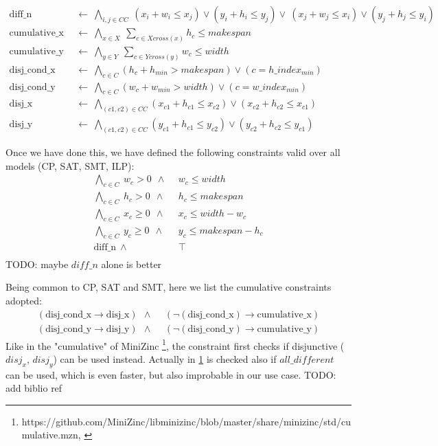     \begin{align}
      \text{diff\_n}\ &\ \leftarrow\ \bigwedge_{i,j \in CC}\ (x_i + w_i \leq x_j) \lor (y_i + h_i \leq y_j) \lor\ (x_j + w_j \leq x_i) \lor (y_j + h_j \leq y_i) \label{eq:diffn} \\
      \text{cumulative\_x}\ &\ \leftarrow\ \bigwedge_{x \in X}\ \sum_{c \in Xcross(x)} h_c \leq makespan \label{eq:cumulative_x} \\
      \text{cumulative\_y}\ &\ \leftarrow\ \bigwedge_{y \in Y}\ \sum_{c \in Ycross(y)} w_c \leq width \label{eq:cumulative_y} \\
      \text{disj\_cond\_x}\ &\ \leftarrow\ \bigwedge_{c \in C} (h_c + h_{min} > makespan) \lor (c = h\_index_{min}) \\
      \text{disj\_cond\_y}\ &\ \leftarrow\ \bigwedge_{c \in C} (w_c + w_{min} > width) \lor (c = w\_index_{min}) \\
      \text{disj\_x}\ &\ \leftarrow\ \bigwedge_{(c1,c2) \in CC} (x_{c1} + h_{c1} \leq x_{c2}) \lor (x_{c2} + h_{c2} \leq x_{c1}) \\
      \text{disj\_y}\ &\ \leftarrow\ \bigwedge_{(c1,c2) \in CC} (y_{c1} + h_{c1} \leq y_{c2}) \lor (y_{c2} + h_{c2} \leq y_{c1})
    \end{align}

    Once we have done this, we have defined the following constraints valid over all models (CP, SAT, SMT, ILP):
    \begin{align*}
        \bigwedge_{c \in C}\ w_c > 0\ \    \land\                   &\ w_c \leq width \\
        \bigwedge_{c \in C}\ h_c > 0\ \   \land\                    &\ h_c \leq makespan \\
        \bigwedge_{c \in C}\ x_c \geq 0\ \ \land\                   &\ x_c \leq width - w_c \\
        \bigwedge_{c \in C}\ y_c \geq 0\ \ \land\                   &\ y_c \leq makespan - h_c \\
        \text{diff\_n}\ \ \land\ &\ \top \\
    \end{align*}
    \colorbox{BurntOrange}{TODO: maybe $diff\_n$ alone is better}

    Being common to CP, SAT and SMT, here we list the cumulative constraints adopted:
    \begin{align*}
        (\text{disj\_cond\_x} \rightarrow \text{disj\_x})\ \ \land\ &\ (\neg (\text{disj\_cond\_x}) \rightarrow \text{cumulative\_x}) \\
        (\text{disj\_cond\_y} \rightarrow \text{disj\_y})\ \ \land\ &\ (\neg (\text{disj\_cond\_y}) \rightarrow \text{cumulative\_y})
    \end{align*}
    Like in the "cumulative" of MiniZinc \footnote[1]{https://github.com/MiniZinc/libminizinc/blob/master/share/minizinc/std/cumulative.mzn, \label{fn:minizinc_cumulative}}, 
    the constraint first checks if disjunctive 
    ($disj_x$, $disj_y$) can be used instead. Actually in \ref{fn:minizinc_cumulative} 
    is checked also if $all\_different$ can be used, which is even faster, but also improbable in our use case. 
    \colorbox{BurntOrange}{TODO: add biblio ref}

